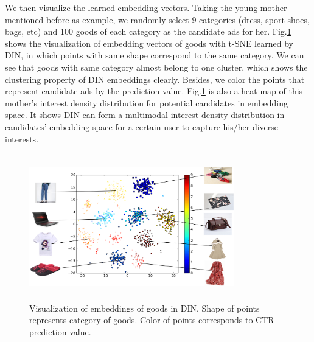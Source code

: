 We then visualize the learned embedding vectors.
Taking the young mother mentioned before as example, we randomly select 9 categories (dress, sport shoes, bags, etc) and 100 goods of each category as the candidate ads for her.
Fig.\ref{fig:TDdiagram} shows the visualization of embedding vectors of goods with t-SNE\cite{tsne} learned by DIN, in which points with same shape correspond to the same category. 
We can see that goods with same category almost belong to one cluster, which shows the clustering property of DIN embeddings clearly.
Besides, we color the points that represent candidate ads by the prediction value. Fig.\ref{fig:TDdiagram} is also a heat map of this mother's interest density distribution for potential  candidates in embedding space. It shows DIN can form a multimodal interest density distribution in candidates' embedding space for a certain user to capture his/her diverse interests. 




\begin{figure}[!t]
\centering
\includegraphics[height=2.5in, width=3.5in, keepaspectratio]{images/omni/TDdiagram.png}
\caption{Visualization of embeddings of goods in DIN. Shape of points represents category of goods. Color of points corresponds to CTR prediction value.}
\label{fig:TDdiagram}
\end{figure}







